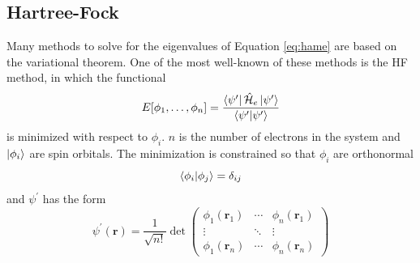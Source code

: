 \documentclass[final,3p,times,twocolumn]{elsarticle}
\newcommand{\ham}{\hat{\mathcal{H}}}
\begin{document}

\subsection{Hartree-Fock} \label{sec:hf}
Many methods to solve for the eigenvalues of Equation \eqref{eq:hame} are based on the variational theorem. %
One of the most well-known of these methods is the HF method,\cite{hartree,fock,roothaan} in which the functional
\begin{equation} \label{eq:hffunc}
E[\phi_1, \ldots, \phi_n] = \dfrac{\bra{\psi^\prime}\ham_e\ket{\psi^\prime}}{\bra{\psi^\prime}\ket{\psi^\prime}}
\end{equation}
is minimized with respect to $\phi_i$. $n$ is the number of electrons in the system and $\ket{\phi_i}$ are spin orbitals. The minimization is constrained so that $\phi_i$ are orthonormal
\begin{equation}
\bra{\phi_i}\ket{\phi_j} = \delta_{ij}
\end{equation}
and $\psi^\prime$ has the form
\begin{equation} \label{eq:det}
\psi^\prime(\mathbf{r}) = \dfrac{1}{\sqrt{n!}}\det\begin{pmatrix} \phi_1(\mathbf{r}_1) & \cdots & \phi_n(\mathbf{r}_1) \\ \vdots & \ddots & \vdots \\
\phi_1(\mathbf{r}_n) & \cdots & \phi_n(\mathbf{r}_n) \end{pmatrix}
\end{equation}
\end{document}
